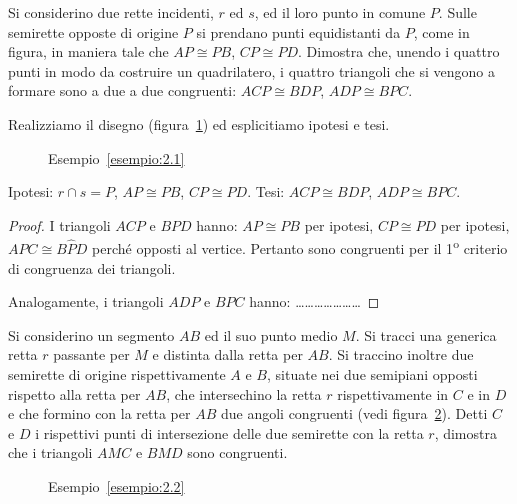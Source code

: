 \begin{exrig}
\begin{esempio}\label{esempio:2.1}
Si considerino due rette incidenti, $r$ ed $s$, ed il loro punto in 
comune $P$. Sulle semirette opposte di origine $P$ si prendano punti 
equidistanti da $P$, come in figura, in maniera tale che $AP\cong 
PB$, $CP\cong PD$. Dimostra che, unendo i quattro punti in modo da 
costruire un quadrilatero, i quattro triangoli che si vengono a 
formare sono a due a due congruenti: $ACP\cong BDP$, $ADP\cong BPC$.

Realizziamo il disegno (figura~\ref{fig:esempio2.1}) ed esplicitiamo 
ipotesi e tesi.


\begin{inaccessibleblock}
 \begin{figure}[htb]
\centering
\caption{Esempio~\ref{esempio:2.1}}\label{fig:esempio2.1}
\end{figure}
\end{inaccessibleblock}

\noindent Ipotesi: $r\cap s=P$, $AP\cong PB$, $CP\cong PD$.\tab\tab 
Tesi: $ACP\cong BDP$, $ADP\cong BPC$.

\begin{proof}
I triangoli $ACP$ e $BPD$ hanno: $AP\cong PB$ per ipotesi, $CP\cong 
PD$ per ipotesi, $A\widehat{P}C\cong B\widehat{P}D$ perché opposti al 
vertice. Pertanto sono congruenti per il 1\textsuperscript{o} 
criterio di congruenza dei triangoli.

Analogamente, i triangoli $ADP$ e $BPC$ hanno: 
\ldots\ldots\ldots\ldots\ldots\ldots\ldots
\end{proof}
\end{esempio}

\begin{esempio}\label{esempio:2.2}
Si considerino un segmento $AB$ ed il suo punto medio $M$. Si tracci 
una generica retta $r$ passante per $M$ e distinta dalla retta per 
$AB$. Si traccino inoltre due semirette di origine rispettivamente 
$A$ e $B$, situate nei due semipiani opposti rispetto alla retta per 
$AB$, che intersechino la retta $r$ rispettivamente in $C$ e in $D$ e 
che formino con la retta per $AB$ due angoli congruenti (vedi 
figura~\ref{fig:esempio2.2}). Detti $C$ e $D$ i rispettivi punti di 
intersezione delle due semirette con la retta $r$, dimostra che i 
triangoli $AMC$ e $BMD$ sono congruenti.


\begin{inaccessibleblock}
 \begin{figure}[htb]
\centering
\caption{Esempio~\ref{esempio:2.2}}\label{fig:esempio2.2}
\end{figure}
\end{inaccessibleblock}


\end{esempio}
\end{exrig}

